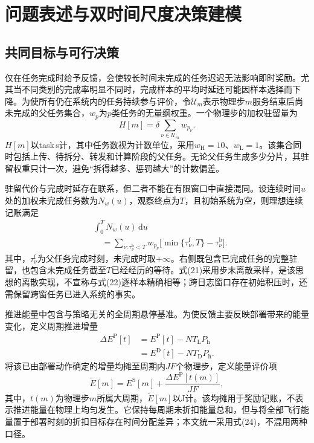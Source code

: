 \section{问题表述与双时间尺度决策建模}
\subsection{共同目标与可行决策}
仅在任务完成时给予反馈，会使较长时间未完成的任务迟迟无法影响即时奖励。尤其当不同类别的完成率明显不同时，完成样本的平均时延还可能因样本选择而下降。为使所有仍在系统内的任务持续参与评价，令$\mathcal U_m$表示物理步$m$服务结束后尚未完成的父任务集合，$w_p$为$p$类任务的无量纲权重。一个物理步的加权驻留量为
\[
H[m]=\delta\sum_{\nu\in\mathcal U_m}w_{p_\nu}.\tag{21}
\]
$H[m]$以task\,s计，其中任务数视为计数单位，采用$w_{\mathrm H}=10$、$w_{\mathrm L}=1$。该集合同时包括上传、待拆分、转发和计算阶段的父任务。无论父任务生成多少分片，其驻留权重只计一次，避免“拆得越多、惩罚越大”的计数偏差。

驻留代价与完成时延存在联系，但二者不能在有限窗口中直接混同。设连续时间$u$处的加权未完成任务数为$N_w(u)$，观察终点为$T$，且初始系统为空，则理想连续记账满足
\[
\begin{aligned}
 &\int_0^T N_w(u)\,\mathrm{d} u\\
 &\quad=\sum_{\nu:\tau_\nu^{\mathrm b}<T}
 w_{p_\nu}\big[\min\{\tau_\nu^{\mathrm f},T\}-\tau_\nu^{\mathrm b}\big].
 \end{aligned}\tag{22}
\]
其中，$\tau_\nu^{\mathrm f}$为父任务完成时刻，未完成时取$+\infty$。右侧既包含已完成任务的完整驻留，也包含未完成任务截至$T$已经经历的等待。式(21)采用步末离散采样，是该思想的离散实现，不宣称与式(22)逐样本精确相等；跨日志窗口存在初始积压时，还需保留跨窗任务已进入系统的事实。

推进能量中包含与策略无关的全周期悬停基准。为使反馈主要反映部署带来的能量变化，定义周期推进增量
\[
\begin{aligned}
 \Delta E^{\mathrm P}[t]&=E^{\mathrm P}[t]-NT_{\mathrm L}P_{\mathrm h}\\
 &=E^{\mathrm D}[t]-NT_{\mathrm D}P_{\mathrm h}.
 \end{aligned}\tag{23}
\]
将该已由部署动作确定的增量均摊至周期内$JF$个物理步，定义能量评价项
\[
\widetilde E[m]=E^{\mathrm S}[m]+
 \frac{\Delta E^{\mathrm P}[t(m)]}{JF},\tag{24}
\]
其中，$t(m)$为物理步$m$所属大周期，$\widetilde E[m]$以J计。该均摊用于奖励记账，不表示推进能量在物理上均匀发生。它保持每周期未折扣能量总和，但与将全部飞行能量置于部署时刻的折扣目标存在时间分配差异；本文统一采用式(24)，不混用两种口径。

